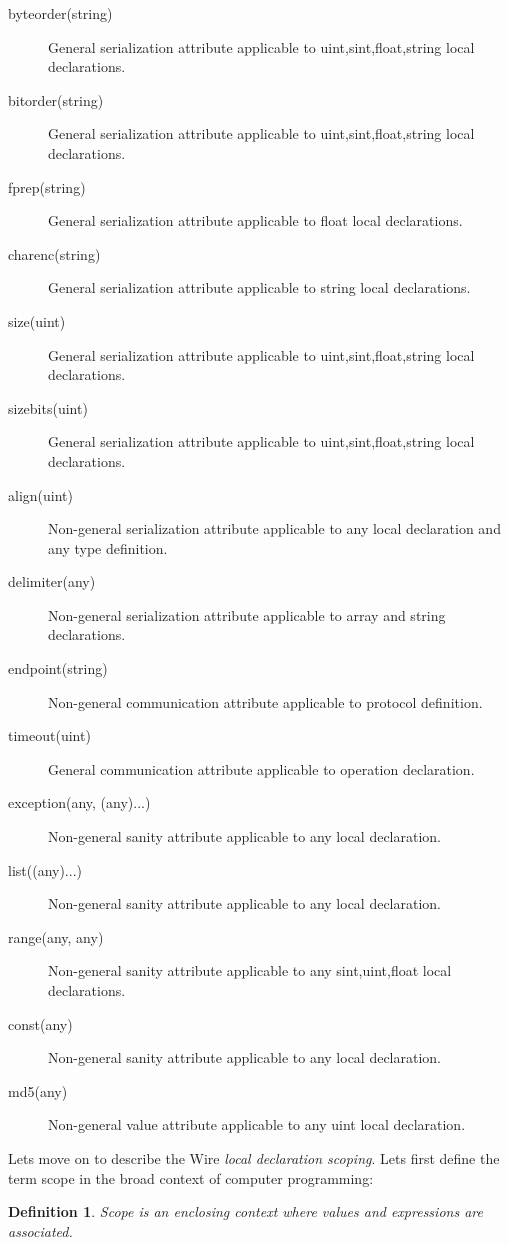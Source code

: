 \documentclass[times, utf8, diplomski]{fer}
\newtheorem{wiredef}{Definition}
\begin{document}
\begin{description}
	\item[byte\textunderscore{}order(string)] General serialization attribute applicable to uint,sint,float,string local declarations.
	\item[bit\textunderscore{}order(string)] General serialization attribute applicable to uint,sint,float,string local declarations.
	\item[fp\textunderscore{}rep(string)] General serialization attribute applicable to float local declarations.
	\item[char\textunderscore{}enc(string)] General serialization attribute applicable to string local declarations.
	\item[size(uint)] General serialization attribute applicable to uint,sint,float,string local declarations.
	\item[size\textunderscore{}bits(uint)] General serialization attribute applicable to uint,sint,float,string local declarations.
	\item[align(uint)] Non-general serialization attribute applicable to any local declaration and any type definition.
	\item[delimiter(any)] Non-general serialization attribute applicable to array and string declarations.
	\item[endpoint(string)] Non-general communication attribute applicable to protocol definition.
	\item[timeout(uint)] General communication attribute applicable to operation declaration.
	\item[exception(any, (any)...)] Non-general sanity attribute applicable to any local declaration.
	\item[list((any)...)] Non-general sanity attribute applicable to any local declaration.
	\item[range(any, any)] Non-general sanity attribute applicable to any sint,uint,float local declarations.
	\item[const(any)] Non-general sanity attribute applicable to any local declaration.
	\item[md5(any)] Non-general value attribute applicable to any uint local declaration.
\end{description}

Lets move on to describe the Wire \emph{local declaration scoping}. Lets first define 
the term scope in the broad context of computer programming:
\begin{wiredef}
Scope is an enclosing context where values and expressions are associated.
\end{wiredef}
\end{document}
